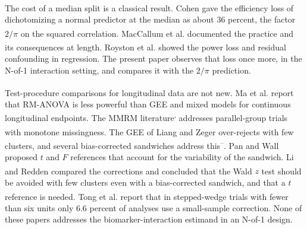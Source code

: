 \documentclass[
  11pt,
]{article}
\begin{document}
The cost of a median split is a classical result.
Cohen\textsuperscript{} gave the efficiency loss of dichotomizing
a normal predictor at the median as about 36 percent, the factor
\(2/\pi\) on the squared correlation. MacCallum et al.\textsuperscript{}
documented the practice and its consequences at length.
Royston et al.\textsuperscript{} showed the power loss and residual
confounding in regression. The present paper observes that loss
once more, in the N-of-1 interaction setting, and compares it with
the \(2/\pi\) prediction.

Test-procedure comparisons for longitudinal data are not new.
Ma et al.\textsuperscript{} report that RM-ANOVA is less powerful than GEE and
mixed models for continuous longitudinal endpoints. The MMRM
literature\textsuperscript{,}
addresses parallel-group trials with monotone missingness. The GEE
of Liang and Zeger\textsuperscript{} over-rejects with few clusters, and several
bias-corrected sandwiches address this\textsuperscript{--}.
Pan and Wall\textsuperscript{} proposed \(t\) and \(F\) references that account for
the variability of the sandwich. Li and Redden\textsuperscript{} compared the
corrections and concluded that the Wald \(z\) test should be avoided
with few clusters even with a bias-corrected sandwich, and that a
\(t\) reference is needed. Tong et al.\textsuperscript{} report that in
stepped-wedge trials with fewer than six units only 6.6 percent of
analyses use a small-sample correction. None of these papers
addresses the biomarker-interaction estimand in an N-of-1 design.
\end{document}
